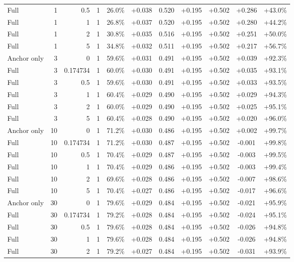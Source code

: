 \begin{table}[htbp]
\begin{tabular}{lrrrccccccc}
Full & 1 & 0.5 & 1 & 26.0\% & +0.038 & 0.520 & +0.195 & +0.502 & +0.286 & +43.0\% \\
Full & 1 & 1 & 1 & 26.8\% & +0.037 & 0.520 & +0.195 & +0.502 & +0.280 & +44.2\% \\
Full & 1 & 2 & 1 & 30.8\% & +0.035 & 0.516 & +0.195 & +0.502 & +0.251 & +50.0\% \\
Full & 1 & 5 & 1 & 34.8\% & +0.032 & 0.511 & +0.195 & +0.502 & +0.217 & +56.7\% \\
Anchor only & 3 & 0 & 1 & 59.6\% & +0.031 & 0.491 & +0.195 & +0.502 & +0.039 & +92.3\% \\
Full & 3 & 0.174734 & 1 & 60.0\% & +0.030 & 0.491 & +0.195 & +0.502 & +0.035 & +93.1\% \\
Full & 3 & 0.5 & 1 & 59.6\% & +0.030 & 0.491 & +0.195 & +0.502 & +0.033 & +93.5\% \\
Full & 3 & 1 & 1 & 60.4\% & +0.029 & 0.490 & +0.195 & +0.502 & +0.029 & +94.3\% \\
Full & 3 & 2 & 1 & 60.0\% & +0.029 & 0.490 & +0.195 & +0.502 & +0.025 & +95.1\% \\
Full & 3 & 5 & 1 & 60.4\% & +0.028 & 0.490 & +0.195 & +0.502 & +0.020 & +96.0\% \\
Anchor only & 10 & 0 & 1 & 71.2\% & +0.030 & 0.486 & +0.195 & +0.502 & +0.002 & +99.7\% \\
Full & 10 & 0.174734 & 1 & 71.2\% & +0.030 & 0.487 & +0.195 & +0.502 & -0.001 & +99.8\% \\
Full & 10 & 0.5 & 1 & 70.4\% & +0.029 & 0.487 & +0.195 & +0.502 & -0.003 & +99.5\% \\
Full & 10 & 1 & 1 & 70.4\% & +0.029 & 0.486 & +0.195 & +0.502 & -0.003 & +99.4\% \\
Full & 10 & 2 & 1 & 69.6\% & +0.028 & 0.486 & +0.195 & +0.502 & -0.007 & +98.6\% \\
Full & 10 & 5 & 1 & 70.4\% & +0.027 & 0.486 & +0.195 & +0.502 & -0.017 & +96.6\% \\
Anchor only & 30 & 0 & 1 & 79.6\% & +0.029 & 0.484 & +0.195 & +0.502 & -0.021 & +95.9\% \\
Full & 30 & 0.174734 & 1 & 79.2\% & +0.028 & 0.484 & +0.195 & +0.502 & -0.024 & +95.1\% \\
Full & 30 & 0.5 & 1 & 79.6\% & +0.028 & 0.484 & +0.195 & +0.502 & -0.026 & +94.8\% \\
Full & 30 & 1 & 1 & 79.6\% & +0.028 & 0.484 & +0.195 & +0.502 & -0.026 & +94.8\% \\
Full & 30 & 2 & 1 & 79.2\% & +0.027 & 0.484 & +0.195 & +0.502 & -0.031 & +93.9\% \\

\end{tabular}
\end{table}

